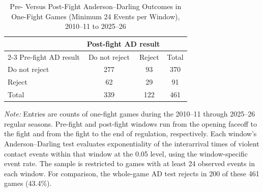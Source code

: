 \begin{table}[htbp]
\centering
\caption{Pre- Versus Post-Fight Anderson--Darling Outcomes in One-Fight Games (Minimum 24 Events per Window), 2010--11 to 2025--26}
\label{tab:one_fight_AD_rejection_min_24_20102011_20252026}
\small
\renewcommand{\arraystretch}{1.15}
\setlength{\tabcolsep}{6pt}

\begin{tabular*}{0.78\textwidth}{@{\extracolsep{\fill}}lccc}
\toprule
 & \multicolumn{2}{c}{Post-fight AD result} & \\
\cmidrule(lr){2-3}
Pre-fight AD result & Do not reject & Reject & Total \\
\midrule
Do not reject & 277 & 93 & 370 \\
Reject & 62 & 29 & 91 \\
\midrule
Total & 339 & 122 & 461 \\
\bottomrule
\end{tabular*}

\vspace{0.4em}
\parbox{0.78\textwidth}{
\footnotesize
\textit{Note:} Entries are counts of one-fight games during the 2010--11 through 2025--26 regular seasons. Pre-fight and post-fight windows run from the opening faceoff to the fight and from the fight to the end of regulation, respectively. Each window's Anderson--Darling test evaluates exponentiality of the interarrival times of violent contact events within that window at the 0.05 level, using the window-specific event rate. The sample is restricted to games with at least 24 observed events in each window. For comparison, the whole-game AD test rejects in 200 of these 461 games (43.4\%).
}
\end{table}

